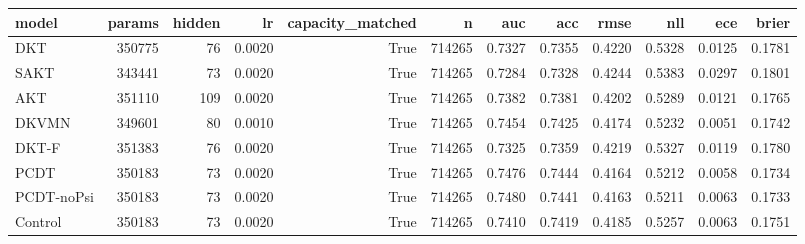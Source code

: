 \begin{tabular}{lrrrrrrrrrrr}
\toprule
model & params & hidden & lr & capacity\_matched & n & auc & acc & rmse & nll & ece & brier \\
\midrule
DKT & 350775 & 76 & 0.0020 & True & 714265 & 0.7327 & 0.7355 & 0.4220 & 0.5328 & 0.0125 & 0.1781 \\
SAKT & 343441 & 73 & 0.0020 & True & 714265 & 0.7284 & 0.7328 & 0.4244 & 0.5383 & 0.0297 & 0.1801 \\
AKT & 351110 & 109 & 0.0020 & True & 714265 & 0.7382 & 0.7381 & 0.4202 & 0.5289 & 0.0121 & 0.1765 \\
DKVMN & 349601 & 80 & 0.0010 & True & 714265 & 0.7454 & 0.7425 & 0.4174 & 0.5232 & 0.0051 & 0.1742 \\
DKT-F & 351383 & 76 & 0.0020 & True & 714265 & 0.7325 & 0.7359 & 0.4219 & 0.5327 & 0.0119 & 0.1780 \\
PCDT & 350183 & 73 & 0.0020 & True & 714265 & 0.7476 & 0.7444 & 0.4164 & 0.5212 & 0.0058 & 0.1734 \\
PCDT-noPsi & 350183 & 73 & 0.0020 & True & 714265 & 0.7480 & 0.7441 & 0.4163 & 0.5211 & 0.0063 & 0.1733 \\
Control & 350183 & 73 & 0.0020 & True & 714265 & 0.7410 & 0.7419 & 0.4185 & 0.5257 & 0.0063 & 0.1751 \\
\bottomrule
\end{tabular}
